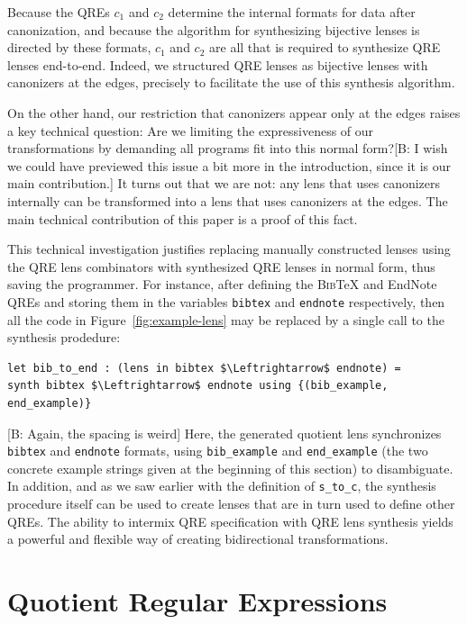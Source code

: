 \documentclass[acmsmall,review,anonymous]{acmart}
\newcommand{\FINISH}[3]{\ifdraft\textcolor{#1}{[#2: #3]}\fi}
\newcommand{\bcp}[1]{\FINISH{dkred}{B}{#1}}
\newcommand{\bibtex}{\textsc{Bib}\TeX{}}
\newcommand{\cd}[1]{\lstinline[backgroundcolor=\color{white}]$#1$}
\begin{document}
Because the QREs $c_1$ and $c_2$ determine the internal formats for data after
canonization, and because the algorithm for synthesizing bijective lenses is
directed by these formats, $c_1$ and $c_2$ are all that is required to
synthesize QRE lenses end-to-end. Indeed, we structured QRE lenses as bijective
lenses with canonizers at the edges, precisely to facilitate the use of this
synthesis algorithm.

On the other hand, our restriction that canonizers appear only at the edges
raises a key technical question:  Are we limiting the expressiveness of our
transformations by demanding all programs fit into this normal form?\bcp{I wish
we could have previewed this issue a bit more in the introduction, since it is
our main contribution.}  It turns out that we are not: any lens that uses
canonizers internally can be transformed into a lens that uses canonizers at
the edges. The main technical contribution of this paper is a proof of this
fact.

This technical investigation justifies replacing manually constructed lenses
using the QRE lens combinators with synthesized QRE lenses in normal form, thus
saving the programmer. For instance, after defining the \bibtex{} and EndNote
QREs and storing them in the variables \cd{bibtex} and \cd{endnote}
respectively, then all the code in Figure~\ref{fig:example-lens} may be
replaced by a single call to the synthesis prodedure:

\begin{lstlisting}
let bib_to_end : (lens in bibtex $\Leftrightarrow$ endnote) =
synth bibtex $\Leftrightarrow$ endnote using {(bib_example, end_example)}
\end{lstlisting}
\bcp{Again, the spacing is weird}
\noindent Here, the generated  quotient lens synchronizes \cd{bibtex} and
\cd{endnote} formats, using \cd{bib_example} and \cd{end_example} (the two
concrete example strings given at the beginning of this section) to
disambiguate. In addition, and as we saw earlier with the definition of
\cd{s_to_c}, the synthesis procedure itself can be used to create lenses that
are in turn used to define other QREs.  The ability to intermix QRE
specification with QRE lens synthesis yields a powerful and flexible way of
creating bidirectional transformations.

\section{Quotient Regular Expressions}
\label{QRE}
\end{document}
